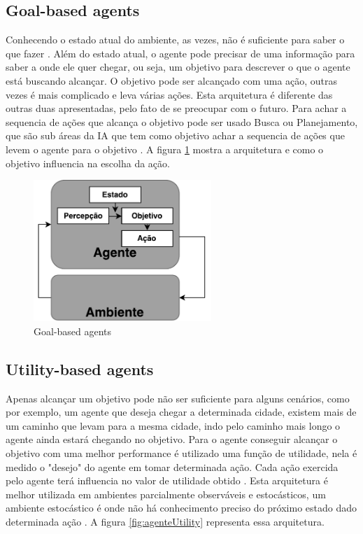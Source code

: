 \subsection{Goal-based agents}

Conhecendo o estado atual do ambiente, as vezes, não é suficiente para saber o que fazer \cite{intelligence2003modern}. Além do estado atual, o agente pode precisar de uma informação para saber a onde ele quer chegar, ou seja, um objetivo para descrever o que o agente está buscando alcançar. O objetivo pode ser alcançado com uma ação, outras vezes é mais complicado e leva várias ações. Esta arquitetura é diferente das outras duas apresentadas, pelo fato de se preocupar com o futuro. Para achar a sequencia de ações que alcança o objetivo pode ser usado Busca ou Planejamento, que são sub áreas da IA que tem como objetivo achar a sequencia de ações que levem o agente para o objetivo \cite{intelligence2003modern}. A figura \ref{fig:agenteGoal} mostra a arquitetura e como o objetivo influencia na escolha da ação. 

\begin{figure}[ht]
	\centering
	\includegraphics[width=0.6\textwidth]{fig/agenteGoal.pdf}
	\caption{Goal-based agents}
	\label{fig:agenteGoal}
\end{figure} 

\subsection{Utility-based agents}

Apenas alcançar um objetivo pode não ser suficiente para alguns cenários, como por exemplo, um agente que deseja chegar a determinada cidade, existem mais de um caminho que levam para a mesma cidade, indo pelo caminho mais longo o agente ainda estará chegando no objetivo. Para o agente conseguir alcançar o objetivo com uma melhor performance é utilizado uma função de utilidade, nela é medido o "desejo" do agente em tomar determinada ação. Cada ação exercida pelo agente terá influencia no valor de utilidade obtido \cite{intelligence2003modern}. Esta arquitetura é melhor utilizada em ambientes parcialmente observáveis e estocásticos, um ambiente estocástico é onde não há conhecimento preciso do próximo estado dado determinada ação \cite{intelligence2003modern}. A figura \ref{fig:agenteUtility} representa essa arquitetura.  

